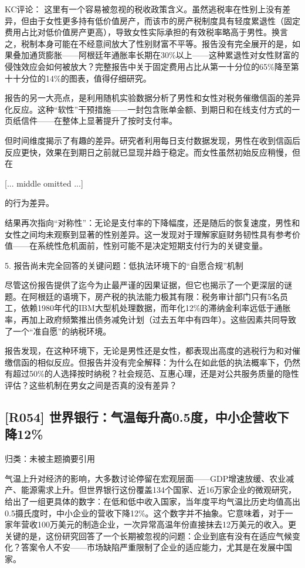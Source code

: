 \documentclass[11pt]{ctexart}
\begin{document}
KC评论： 这里有一个容易被忽视的税收政策含义。虽然逃税率在性别上没有差异，但由于女性更多持有低价值房产，而该市的房产税制度具有轻度累退性（固定费用占比对低价值房产更高），导致女性实际承担的有效税率略高于男性。换言之，税制本身可能在不经意间放大了性别财富不平等。报告没有完全展开的是，如果叠加通货膨胀——阿根廷年通胀率长期在30\%以上——这种累退性对女性财富的侵蚀效应会如何被放大？完整报告中关于固定费用占比从第一十分位的65\%降至第十十分位的14\%的图表，值得仔细研究。

报告的另一大亮点，是利用随机实验数据分析了男性和女性对税务催缴信函的差异化反应。这种“软性”干预措施——一封包含账单金额、到期日和在线支付方式的一页纸信件——在整体上显著提升了按时支付率。

但时间维度揭示了有趣的差异。研究者利用每日支付数据发现，男性在收到信函后反应更快，效果在到期日之前就已显现并趋于稳定。而女性虽然初始反应稍慢，但在

[... middle omitted ...]

的行为差异。

结果再次指向“对称性”：无论是支付率的下降幅度，还是随后的恢复速度，男性和女性之间均未观察到显著的性别差异。这一发现对于理解家庭财务韧性具有参考价值——在系统性危机面前，性别可能不是决定短期支付行为的关键变量。

5. 报告尚未完全回答的关键问题：低执法环境下的“自愿合规”机制

尽管这份报告提供了迄今为止最严谨的因果证据，但它也揭示了一个更深层的谜题。在阿根廷的语境下，房产税的执法能力极其有限：税务审计部门只有5名员工，依赖1980年代的IBM大型机处理数据，而年化12\%的滞纳金利率远低于通胀率，再加上政府频繁推出债务减免计划（过去五年中有四年）。这些因素共同导致了一个“准自愿”的纳税环境。

报告发现，在这种环境下，无论是男性还是女性，都表现出高度的逃税行为和对催缴信函的相似反应。但报告并没有完全解释：为什么在如此低的执法概率下，仍然有超过50\%的人选择按时纳税？社会规范、互惠心理，还是对公共服务质量的隐性评估？这些机制在男女之间是否真的没有差异？

\subsection{[R054] 世界银行：气温每升高0.5度，中小企营收下降12\%}
{\small\color{refgray}归类：未被主题摘要引用}

气温上升对经济的影响，大多数讨论停留在宏观层面——GDP增速放缓、农业减产、能源需求上升。但世界银行这份覆盖134个国家、近16万家企业的微观研究，给出了一组更具体的数字：在低和低中收入国家，当年度平均气温比历史均值高出0.5摄氏度时，中小企业的营收下降12\%。这个数字并不抽象。它意味着，对于一家年营收100万美元的制造企业，一次异常高温年份直接抹去12万美元的收入。更关键的是，这份研究回答了一个长期被忽视的问题：企业到底有没有在适应气候变化？答案令人不安——市场缺陷严重限制了企业的适应能力，尤其是在发展中国家。
\end{document}
